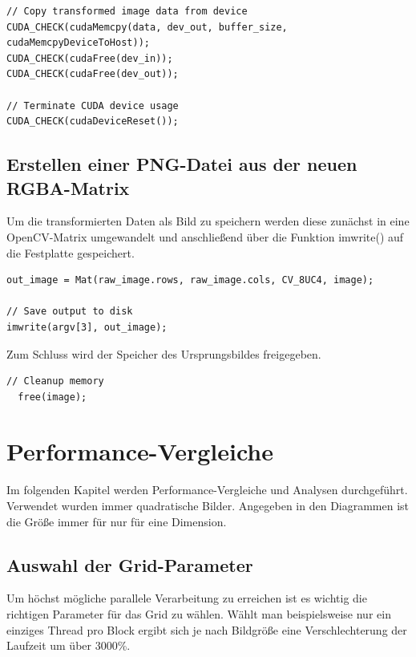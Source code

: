 \documentclass{llncs}
\begin{document}
\begin{lstlisting}
// Copy transformed image data from device
CUDA_CHECK(cudaMemcpy(data, dev_out, buffer_size, cudaMemcpyDeviceToHost));
CUDA_CHECK(cudaFree(dev_in));
CUDA_CHECK(cudaFree(dev_out));

// Terminate CUDA device usage
CUDA_CHECK(cudaDeviceReset());
\end{lstlisting}

%
\subsection{Erstellen einer PNG-Datei aus der neuen RGBA-Matrix}
%
Um die transformierten Daten als Bild zu speichern werden diese zunächst in eine OpenCV-Matrix umgewandelt und anschließend über die Funktion imwrite() auf die Festplatte gespeichert.

\begin{lstlisting}
out_image = Mat(raw_image.rows, raw_image.cols, CV_8UC4, image);

// Save output to disk
imwrite(argv[3], out_image);
\end{lstlisting}

Zum Schluss wird der Speicher des Ursprungsbildes freigegeben.

\begin{lstlisting}
// Cleanup memory
  free(image);
\end{lstlisting}


%
\section{Performance-Vergleiche}
%

Im folgenden Kapitel werden Performance-Vergleiche und Analysen durchgeführt.
Verwendet wurden immer quadratische Bilder. Angegeben in den Diagrammen ist die Größe immer für nur für eine Dimension.

%
\subsection{Auswahl der Grid-Parameter}
%

Um höchst mögliche parallele Verarbeitung zu erreichen ist es wichtig die richtigen Parameter für das Grid zu wählen. Wählt man beispielsweise nur ein einziges Thread pro Block ergibt sich je nach Bildgröße eine Verschlechterung der Laufzeit um über 3000\%.
\end{document}
